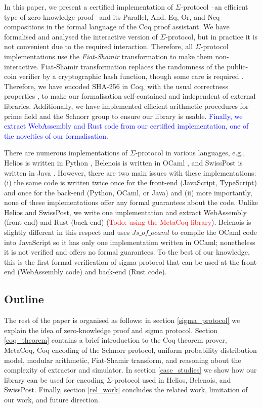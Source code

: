 \documentclass[conference,compsoc]{IEEEtran}
\begin{document}
In this paper, we present a certified implementation of $\Sigma$-protocol --an efficient 
type of zero-knowledge proof-- and its Parallel, And, Eq, Or, and Neq compositions in 
the formal language of the Coq proof assistant. 
We have formalised and analysed the interactive version of 
$\Sigma$-protocol, but in practice it is not convenient due to the required interaction. 
Therefore, all $\Sigma$-protocol implementations use the \textit{Fiat-Shamir} 
transformation \cite{10.5555/36664.36676} to make them non-interactive. 
Fiat-Shamir transformation replaces the randomness of the public-coin verifier by 
a cryptographic hash function, though 
some care is required \cite{10.1007/978-3-642-34961-4_38}.
Therefore, we have encoded SHA-256 in Coq, with the usual correctness properties \cite{nist_fips_180_4},
to make our formalisation self-contained and independent of external libraries. Additionally, we 
have implemented efficient arithmetic procedures for prime field and the Schnorr group to 
ensure our library is usable. \textcolor{blue}{Finally, we extract WebAssembly and 
Rust code from our certified implementation, one of the novelties of our 
formalisation}.


There are numerous implementations of  $\Sigma$-protocol in various languages, 
e.g., Helios is written in Python \cite{helios_crypto}, Belenois is written in OCaml \cite{belenios_core}, 
and SwissPost is written in Java \cite{swisspost_crypto_primitives}.
However, there are two main issues with these implementations: 
(i) the same code is written twice 
once for the front-end (JavaScript, TypeScript) and once for the back-end (Python, OCaml, or Java) and 
 (ii) more importantly, none of these implementations offer any formal guarantees about the code.
Unlike Helios and SwissPost,
we write one implementation and extract WebAssembly (front-end) and Rust (back-end) (\textcolor{red}{Todo: using the MetaCoq library}).
Belenois is slightly different in this respect and uses $Js\_of\_ocaml$ \cite{js_of_ocaml}
to compile the OCaml code into JavaScript so it has only one 
implementation written in OCaml; nonetheless it is not verified 
and offers no formal guarantees. To the best of our knowledge, 
this is the first formal verification of sigma protocol that can be used at 
the front-end (WebAssembly code) and back-end (Rust code). 

\subsection{Outline}
The rest of the paper is organised as follows: in section \ref{sigma_protocol}
we explain the idea of zero-knowledge proof and sigma protocol. 
Section \ref{coq_theorem} contains a brief introduction to 
the Coq theorem prover, MetaCoq, Coq encoding of the Schnorr protocol, 
uniform probability distribution model, modular arithmetic, Fiat-Shamir transform,
and reasoning about the complexity of extractor and simulator. 
In section \ref{case_studies} we show how our library can be used 
for encoding $\Sigma$-protocol used in Helios, Belenois, and SwissPost. 
Finally, section \ref{rel_work} concludes the related work, limitation of 
our work, and future direction. 
\end{document}
